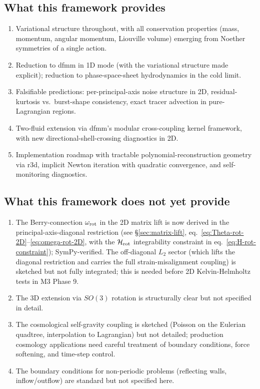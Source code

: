\documentclass[11pt]{article}
\begin{document}
\subsection{What this framework provides}

\begin{enumerate}
\item Variational structure throughout, with all conservation
properties (mass, momentum, angular momentum, Liouville volume)
emerging from Noether symmetries of a single action.
\item Reduction to dfmm in 1D mode (with the variational structure
made explicit); reduction to phase-space-sheet hydrodynamics in the
cold limit.
\item Falsifiable predictions: per-principal-axis noise structure
in 2D, residual-kurtosis vs.\ burst-shape consistency, exact tracer
advection in pure-Lagrangian regions.
\item Two-fluid extension via dfmm's modular cross-coupling kernel
framework, with new directional-shell-crossing diagnostics in 2D.
\item Implementation roadmap with tractable polynomial-reconstruction
geometry via r3d, implicit Newton iteration with quadratic
convergence, and self-monitoring diagnostics.
\end{enumerate}

\subsection{What this framework does not yet provide}

\begin{enumerate}
\item The Berry-connection $\omega_{\rm rot}$ in the 2D matrix lift
is now derived in the principal-axis-diagonal restriction
(see §\ref{sec:matrix-lift}, eq.~\ref{eq:Theta-rot-2D}--\ref{eq:omega-rot-2D},
with the $\mathcal{H}_{\rm rot}$ integrability constraint in
eq.~\ref{eq:H-rot-constraint}); SymPy-verified. The off-diagonal
$L_2$ sector (which lifts the diagonal restriction and carries the full
strain-misalignment coupling) is sketched but not fully integrated;
this is needed before 2D Kelvin-Helmholtz tests in M3 Phase 9.
\item The 3D extension via $SO(3)$ rotation is structurally clear but
not specified in detail.
\item The cosmological self-gravity coupling is sketched (Poisson on
the Eulerian quadtree, interpolation to Lagrangian) but not
detailed; production cosmology applications need careful treatment of
boundary conditions, force softening, and time-step control.
\item The boundary conditions for non-periodic problems (reflecting
walls, inflow/outflow) are standard but not specified here.
\end{enumerate}
\end{document}
